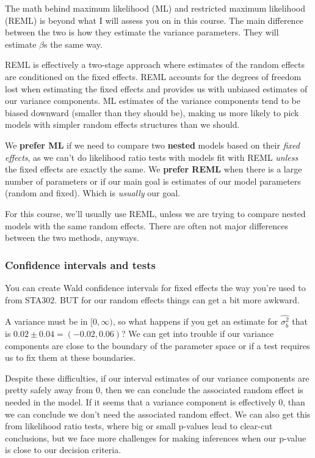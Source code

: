 \documentclass[
  openany]{book}
\begin{document}
The math behind maximum likelihood (ML) and restricted maximum likelihood (REML) is beyond what I will assess you on in this course. The main difference between the two is how they estimate the variance parameters. They will estimate \(\beta\)s the same way.

REML is effectively a two-stage approach where estimates of the random effects are conditioned on the fixed effects. REML accounts for the degrees of freedom lost when estimating the fixed effects and provides us with unbiased estimates of our variance components. ML estimates of the variance components tend to be biased downward (smaller than they should be), making us more likely to pick models with simpler random effects structures than we should.

We \textbf{prefer ML} if we need to compare two \textbf{nested} models based on their \emph{fixed effects}, as we can't do likelihood ratio tests with models fit with REML \emph{unless} the fixed effects are exactly the same. We \textbf{prefer REML} when there is a large number of parameters or if our main goal is estimates of our model parameters (random and fixed). Which is \emph{usually} our goal.

For this course, we'll usually use REML, unless we are trying to compare nested models with the same random effects. There are often not major differences between the two methods, anyways.

\hypertarget{confidence-intervals-and-tests}{%
\subsubsection{Confidence intervals and tests}\label{confidence-intervals-and-tests}}

You can create Wald confidence intervals for fixed effects the way you're used to from STA302. BUT for our random effects things can get a bit more awkward.

A variance must be in \([0, \infty)\), so what happens if you get an estimate for \(\hat{\sigma_b^2}\) that is \(0.02 \pm 0.04 = (-0.02, 0.06)\)? We can get into trouble if our variance components are close to the boundary of the parameter space or if a test requires us to fix them at these boundaries.

Despite these difficulties, if our interval estimates of our variance components are pretty safely away from 0, then we can conclude the associated random effect is needed in the model. If it seems that a variance component is effectively 0, than we can conclude we don't need the associated random effect. We can also get this from likelihood ratio tests, where big or small p-values lead to clear-cut conclusions, but we face more challenges for making inferences when our p-value is close to our decision criteria.
\end{document}
